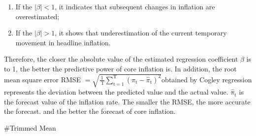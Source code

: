 \documentclass[
]{article}
\begin{document}
\begin{enumerate}
\def\labelenumi{\arabic{enumi}.}
\item
  If the \(|\beta|<1\), it indicates that subsequent changes in
  inflation are overestimated;
\item
  If the \(|\beta|>1\), it shows that underestimation of the current
  temporary movement in headline inflation.
\end{enumerate}

Therefore, the closer the absolute value of the estimated regression
coefficient \(\beta\) is to 1, the better the predictive power of core
inflation is. In addition, the root mean square error RMSE
\(=\sqrt{\frac{1}{\mathrm{~T}} \sum_{\mathrm{t}=1}^{\mathrm{T}}\left(\pi_{\mathrm{t}}-\hat\pi_{\mathrm{t}}\right)^{2}}\)obtained
by Cogley regression represents the deviation between the predicted
value and the actual value. \(\hat\pi_{\mathrm{t}}\) is the forecast
value of the inflation rate. The smaller the RMSE, the more accurate the
forecast. and the better the forecast of core inflation.

\#Trimmed Mean
\end{document}
